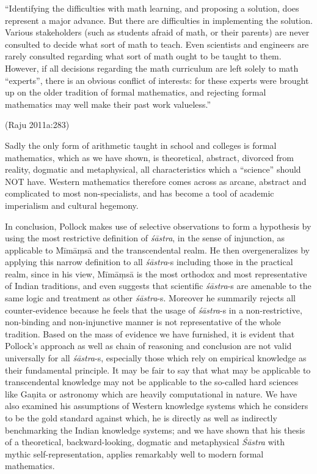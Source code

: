 \begin{myquote}
``Identifying the difficulties with math learning, and proposing a solution, does represent a major advance. But there are difficulties in implementing the solution. Various stakeholders (such as students afraid of math, or their parents) are never consulted to decide what sort of math to teach. Even scientists and engineers are rarely consulted regarding what sort of math ought to be taught to them. However, if all decisions regarding the math curriculum are left solely to math ``experts'', there is an obvious conflict of interests: for these experts were brought up on the older tradition of formal mathematics, and rejecting formal mathematics may well make their past work valueless.'' 

\hfill (Raju 2011a:283) 
\end{myquote}
Sadly the only form of arithmetic taught in school and colleges is formal mathematics, which as we have shown, is theoretical, abstract, divorced from reality, dogmatic and metaphysical, all characteristics which a ``science'' should NOT have. Western mathematics therefore comes across as arcane, abstract and complicated to most non-specialists, and has become a tool of academic imperialism and cultural hegemony.

In conclusion, Pollock makes use of selective observations to form a hypothesis by using the most restrictive definition of {\sl śāstra}, in the sense of injunction, as applicable to Mīmāṃsā and the transcendental realm. He then overgeneralizes by applying this narrow definition to all {\sl śāstra}-s including those in the practical realm, since in his view, Mīmāṃsā is the most orthodox and most representative of Indian traditions, and even suggests that scientific {\sl śāstra}-s are amenable to the same logic and treatment as other {\sl śāstra}-s. Moreover he summarily rejects all counter-evidence because he feels that the usage of {\sl śāstra}-s in a non-restrictive, non-binding and non-injunctive manner is not representative of the whole tradition. Based on the mass of evidence we have furnished, it is evident that Pollock’s approach as well as chain of reasoning and conclusion are not valid universally for all {\sl śāstra}-s, especially those which rely on empirical knowledge as their fundamental principle. It may be fair to say that what may be applicable to transcendental knowledge may not be applicable to the so-called hard sciences like Gaṇita or astronomy which are heavily computational in nature. We have also examined his assumptions of Western knowledge systems which he considers to be the gold standard against which, he is directly as well as indirectly benchmarking the Indian knowledge systems; and we have shown that his thesis of a theoretical, backward-looking, dogmatic and metaphysical {\sl Śāstra} with mythic self-representation, applies remarkably well to modern formal mathematics.

